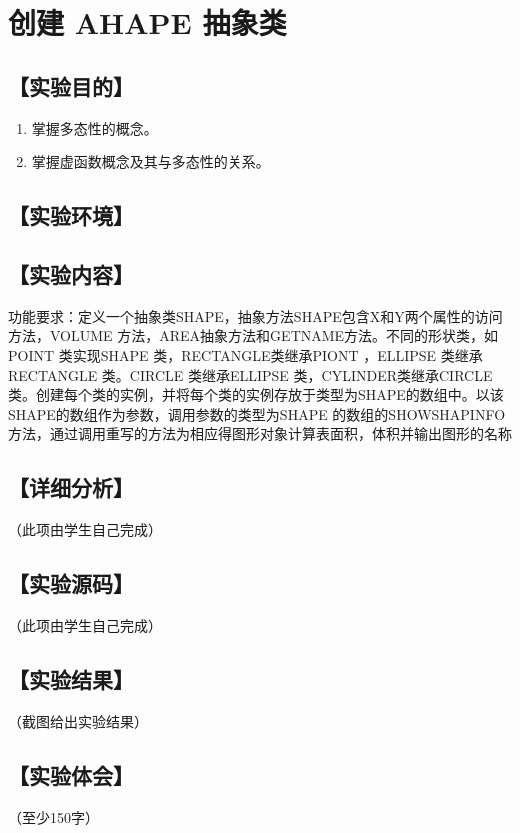 \section{创建 AHAPE 抽象类}
\hfill{}
\subsection*{【实验目的】}
\begin{enumerate}[topsep=0pt,partopsep=0pt,itemsep=0pt,parsep=0pt,label={\arabic*、}]
\item 掌握多态性的概念。
\item 掌握虚函数概念及其与多态性的关系。
\end{enumerate}
\subsection*{【实验环境】}
\MyEnvironment
\subsection*{【实验内容】}
功能要求：定义一个抽象类SHAPE，抽象方法SHAPE包含X和Y两个属性的访问方法，VOLUME 方法，AREA抽象方法和GETNAME方法。不同的形状类，如POINT 类实现SHAPE 类，RECTANGLE类继承PIONT ，ELLIPSE 类继承RECTANGLE 类。CIRCLE 类继承ELLIPSE 类，CYLINDER类继承CIRCLE类。创建每个类的实例，并将每个类的实例存放于类型为SHAPE的数组中。以该SHAPE的数组作为参数，调用参数的类型为SHAPE 的数组的SHOWSHAPINFO方法，通过调用重写的方法为相应得图形对象计算表面积，体积并输出图形的名称
\subsection*{【详细分析】}
（此项由学生自己完成）
\subsection*{【实验源码】}
（此项由学生自己完成）
\subsection*{【实验结果】}
（截图给出实验结果）
\subsection*{【实验体会】}
（至少150字）
